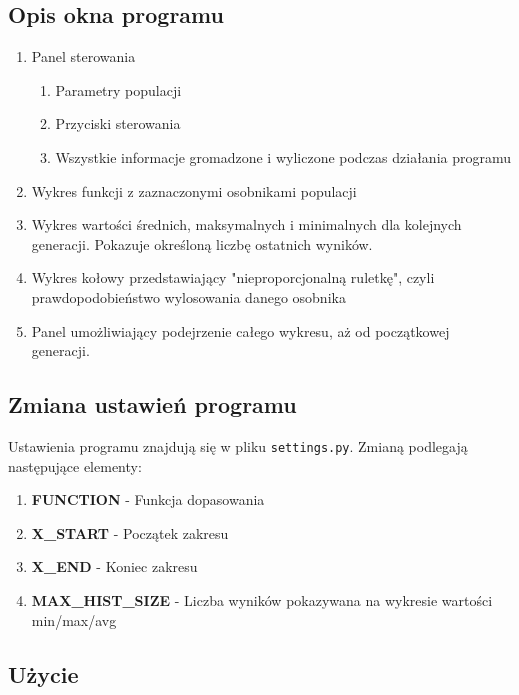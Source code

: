 \documentclass[a4paper,11pt]{article}
\begin{document}
		\subsection{Opis okna programu}
			\begin{enumerate}
				\item Panel sterowania
				\begin{enumerate}
					\item Parametry populacji
					\item Przyciski sterowania
					\item Wszystkie informacje gromadzone i wyliczone podczas działania programu
				\end{enumerate}
				\item Wykres funkcji z zaznaczonymi osobnikami populacji
				\item Wykres wartości średnich, maksymalnych i minimalnych dla kolejnych generacji. Pokazuje określoną liczbę ostatnich wyników. 
				\item Wykres kołowy przedstawiający "nieproporcjonalną ruletkę", czyli prawdopodobieństwo wylosowania danego osobnika
				\item Panel umożliwiający podejrzenie całego wykresu, aż od początkowej generacji.
			\end{enumerate}
		
		\subsection{Zmiana ustawień programu}
			Ustawienia programu znajdują się w pliku \texttt{settings.py}. Zmianą podlegają następujące elementy:
			\begin{enumerate}
				\item \textbf{FUNCTION} - Funkcja dopasowania
				\item \textbf{X\_START} - Początek zakresu
				\item \textbf{X\_END} - Koniec zakresu
				\item \textbf{MAX\_HIST\_SIZE} - Liczba wyników pokazywana na wykresie wartości min/max/avg
			\end{enumerate}
	
		\subsection{Użycie}
\end{document}
